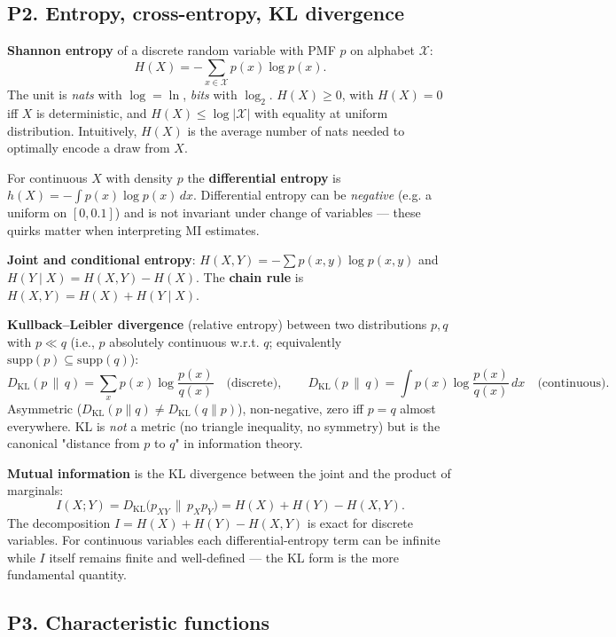 \documentclass{article}
\begin{document}
\subsection{P2. Entropy, cross-entropy, KL
divergence}\label{p2-entropy-cross-entropy-kl-divergence}

\textbf{Shannon entropy} of a discrete random variable with PMF \(p\) on
alphabet \(\mathcal{X}\): \[
H(X) = -\sum_{x \in \mathcal{X}} p(x) \log p(x).
\] The unit is \emph{nats} with \(\log = \ln\), \emph{bits} with
\(\log_2\). \(H(X) \geq 0\), with \(H(X) = 0\) iff \(X\) is
deterministic, and \(H(X) \leq \log |\mathcal{X}|\) with equality at
uniform distribution. Intuitively, \(H(X)\) is the average number of
nats needed to optimally encode a draw from \(X\).

For continuous \(X\) with density \(p\) the \textbf{differential
entropy} is \(h(X) = -\int p(x) \log p(x)\, dx\). Differential entropy
can be \emph{negative} (e.g. a uniform on \([0, 0.1]\)) and is not
invariant under change of variables --- these quirks matter when
interpreting MI estimates.

\textbf{Joint and conditional entropy}:
\(H(X, Y) = -\sum p(x, y) \log p(x, y)\) and
\(H(Y \mid X) = H(X, Y) - H(X)\). The \textbf{chain rule} is
\(H(X, Y) = H(X) + H(Y \mid X)\).

\textbf{Kullback--Leibler divergence} (relative entropy) between two
distributions \(p, q\) with \(p \ll q\) (i.e., \(p\) absolutely continuous w.r.t.
\(q\); equivalently \(\mathrm{supp}(p) \subseteq \mathrm{supp}(q)\)): \[
D_{\mathrm{KL}}(p \,\|\, q) = \sum_x p(x) \log \frac{p(x)}{q(x)} \quad \text{(discrete)},
\qquad
D_{\mathrm{KL}}(p \,\|\, q) = \int p(x) \log \frac{p(x)}{q(x)}\,dx \quad \text{(continuous)}.
\] Asymmetric (\(D_{\mathrm{KL}}(p\|q) \neq D_{\mathrm{KL}}(q\|p)\)),
non-negative, zero iff \(p = q\) almost everywhere. KL is \emph{not} a
metric (no triangle inequality, no symmetry) but is the canonical
"distance from \(p\) to \(q\)" in information theory.

\textbf{Mutual information} is the KL divergence between the joint and
the product of marginals: \[
I(X; Y) = D_{\mathrm{KL}}\big(p_{XY} \,\|\, p_X p_Y\big) = H(X) + H(Y) - H(X, Y).
\] The decomposition \(I = H(X) + H(Y) - H(X,Y)\) is exact for discrete
variables. For continuous variables each differential-entropy term can be
infinite while \(I\) itself remains finite and well-defined --- the KL
form is the more fundamental quantity.

\subsection{P3. Characteristic
functions}\label{p3-characteristic-functions}
\end{document}
